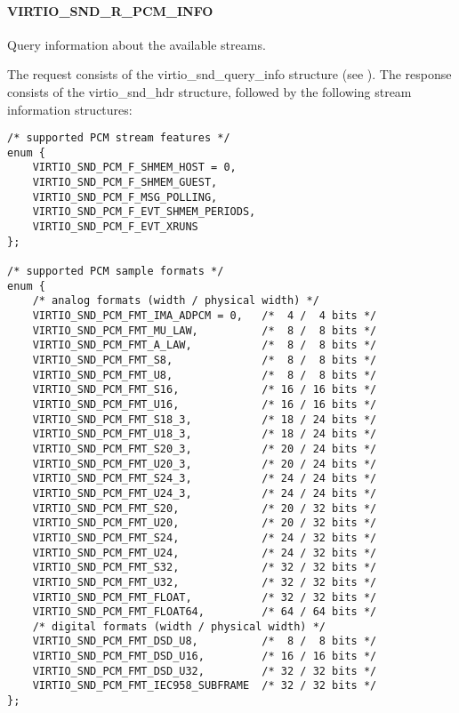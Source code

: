 \paragraph{VIRTIO_SND_R_PCM_INFO}

Query information about the available streams.

The request consists of the virtio_snd_query_info structure
(see ).
The response consists of the virtio_snd_hdr structure, followed by the following
stream information structures:

\begin{lstlisting}
/* supported PCM stream features */
enum {
    VIRTIO_SND_PCM_F_SHMEM_HOST = 0,
    VIRTIO_SND_PCM_F_SHMEM_GUEST,
    VIRTIO_SND_PCM_F_MSG_POLLING,
    VIRTIO_SND_PCM_F_EVT_SHMEM_PERIODS,
    VIRTIO_SND_PCM_F_EVT_XRUNS
};

/* supported PCM sample formats */
enum {
    /* analog formats (width / physical width) */
    VIRTIO_SND_PCM_FMT_IMA_ADPCM = 0,   /*  4 /  4 bits */
    VIRTIO_SND_PCM_FMT_MU_LAW,          /*  8 /  8 bits */
    VIRTIO_SND_PCM_FMT_A_LAW,           /*  8 /  8 bits */
    VIRTIO_SND_PCM_FMT_S8,              /*  8 /  8 bits */
    VIRTIO_SND_PCM_FMT_U8,              /*  8 /  8 bits */
    VIRTIO_SND_PCM_FMT_S16,             /* 16 / 16 bits */
    VIRTIO_SND_PCM_FMT_U16,             /* 16 / 16 bits */
    VIRTIO_SND_PCM_FMT_S18_3,           /* 18 / 24 bits */
    VIRTIO_SND_PCM_FMT_U18_3,           /* 18 / 24 bits */
    VIRTIO_SND_PCM_FMT_S20_3,           /* 20 / 24 bits */
    VIRTIO_SND_PCM_FMT_U20_3,           /* 20 / 24 bits */
    VIRTIO_SND_PCM_FMT_S24_3,           /* 24 / 24 bits */
    VIRTIO_SND_PCM_FMT_U24_3,           /* 24 / 24 bits */
    VIRTIO_SND_PCM_FMT_S20,             /* 20 / 32 bits */
    VIRTIO_SND_PCM_FMT_U20,             /* 20 / 32 bits */
    VIRTIO_SND_PCM_FMT_S24,             /* 24 / 32 bits */
    VIRTIO_SND_PCM_FMT_U24,             /* 24 / 32 bits */
    VIRTIO_SND_PCM_FMT_S32,             /* 32 / 32 bits */
    VIRTIO_SND_PCM_FMT_U32,             /* 32 / 32 bits */
    VIRTIO_SND_PCM_FMT_FLOAT,           /* 32 / 32 bits */
    VIRTIO_SND_PCM_FMT_FLOAT64,         /* 64 / 64 bits */
    /* digital formats (width / physical width) */
    VIRTIO_SND_PCM_FMT_DSD_U8,          /*  8 /  8 bits */
    VIRTIO_SND_PCM_FMT_DSD_U16,         /* 16 / 16 bits */
    VIRTIO_SND_PCM_FMT_DSD_U32,         /* 32 / 32 bits */
    VIRTIO_SND_PCM_FMT_IEC958_SUBFRAME  /* 32 / 32 bits */
};


\end{lstlisting}
